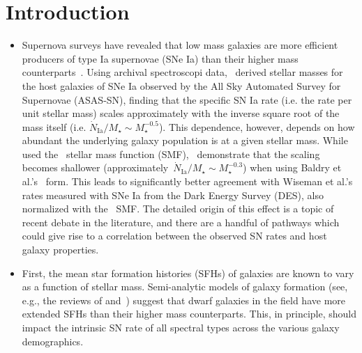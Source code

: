 \documentclass[ms.tex]{subfiles}
\begin{document}
\section{Introduction}
\label{sec:intro}

\begin{itemize}

	\item Supernova surveys have revealed that low mass galaxies are
	more efficient producers of type Ia supernovae (SNe Ia) than their higher
	mass counterparts~\citep[e.g.][]{Mannucci2005}.
	Using archival spectroscopi data,~\citet{Brown2019} derived stellar
	masses for the host galaxies of SNe Ia observed by the All Sky
	Automated Survey for Supernovae (ASAS-SN), finding that the specific SN
	Ia rate (i.e. the rate per unit stellar mass) scales approximately with
	the inverse square root of the mass itself (i.e.
	$\dot{N}_\text{Ia} / M_\star \sim M_\star^{-0.5}$).
	This dependence, however, depends on how abundant the underlying galaxy
	population is at a given stellar mass.
	While~\citet{Brown2019} used the~\citet{Bell2003} stellar mass function
	(SMF),~\citet{Gandhi2022} demonstrate that the scaling becomes shallower
	(approximately~$\dot{N}_\text{Ia} / M_\star \sim M_\star^{-0.3}$) when
	using Baldry et al.'s~\citeyear{Baldry2012} form.
	This leads to significantly better agreement with Wiseman et al.'s
	\citeyear{Wiseman2021} rates measured with SNe Ia from the Dark Energy
	Survey (DES), also normalized with the~\citet{Baldry2012} SMF.
	The detailed origin of this effect is a topic of recent debate in
	the literature, and there are a handful of pathways which could give rise
	to a correlation between the observed SN rates and host galaxy properties.

	\item First, the mean star formation histories (SFHs) of galaxies are known
	to vary as a function of stellar mass.
	Semi-analytic models of galaxy formation (see, e.g., the reviews of
	\citealp{Baugh2006} and~\citealp*{Somerville2015a}) suggest that dwarf
	galaxies in the field have more extended SFHs than their higher mass
	counterparts.
	This, in principle, should impact the intrinsic SN rate of all spectral
	types across the various galaxy demographics.


\end{itemize}
\end{document}
